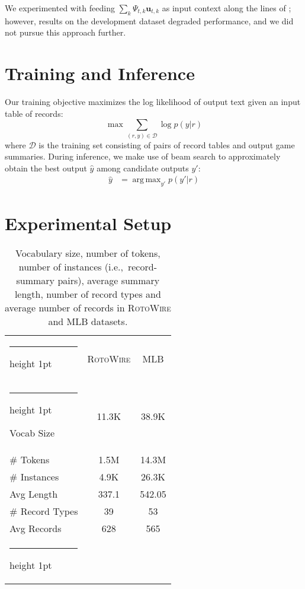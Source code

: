 \documentclass[11pt,a4paper]{article}
\makeatletter
\DeclareMathOperator*{\argmax}{arg\,max}
\newcommand{\thickhline}{\noalign {\ifnum 0=`}\fi \hrule height 1pt
    \futurelet \reserved@a \@xhline
}
\makeatother
\begin{document}
We experimented with feeding $\sum_k \Psi_{t,k} \mathbf{u}_{t,k}$ as input
context along the lines of ; however, results on the
development dataset degraded performance, and we did not pursue this
approach further.

\section{Training and Inference}
Our training objective maximizes the log likelihood of output text
given an input table of records:
\begin{equation}
\max \sum_{(r, y) \in \mathcal{D} }{ \log{p \left( y | r \right)}} \nonumber
\end{equation}
where $\mathcal{D}$ is the training set consisting of pairs of record
tables and output game summaries.  During inference, we make use of
beam search to approximately obtain the best output $\hat{y}$ among
candidate outputs $y'$:
\begin{align}
\hat{y} &= \argmax_{y'} p(y' | r) \nonumber
\end{align}


\section{Experimental Setup}
\label{sec:experimental-setup}


\begin{table}[t]
\small
\begin{center}
\begin{tabular}{lcc} \thickhline 
  & \textsc{RotoWire} & MLB \\ 
\thickhline 
Vocab Size & 11.3K & 38.9K \\ 
\# Tokens & 1.5M & 14.3M \\ 
\# Instances & 4.9K & 26.3K \\ 
Avg  Length & 337.1 & 542.05 \\ 
\# Record Types & 39 & 53 \\ 
Avg Records & 628 & 565 \\ \thickhline 
\end{tabular} 
\end{center}
\caption{Vocabulary size, number of tokens,  number of instances
  (i.e.,~record-summary pairs), average
  summary length, number of record types and average number of records in
  \textsc{RotoWire} and MLB datasets.}
\label{dataset-stats}
\end{table}
\end{document}
